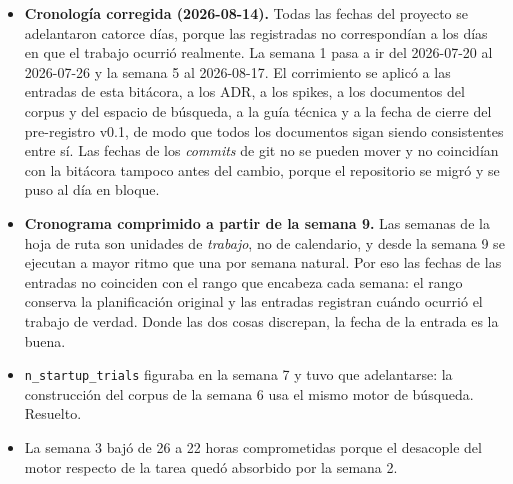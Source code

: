 \documentclass[11pt,letterpaper]{article}
\begin{document}
\begin{itemize}[leftmargin=1.4em]
  \item \textbf{Cronología corregida (2026-08-14).} Todas las fechas del proyecto se
        adelantaron catorce días, porque las registradas no correspondían a los días en
        que el trabajo ocurrió realmente. La semana 1 pasa a ir del 2026-07-20 al
        2026-07-26 y la semana 5 al 2026-08-17. El corrimiento se aplicó a las entradas de
        esta bitácora, a los ADR, a los spikes, a los documentos del corpus y del espacio
        de búsqueda, a la guía técnica y a la fecha de cierre del pre-registro v0.1, de
        modo que todos los documentos sigan siendo consistentes entre sí. Las fechas de
        los \emph{commits} de git no se pueden mover y no coincidían con la bitácora
        tampoco antes del cambio, porque el repositorio se migró y se puso al día en
        bloque.
  \item \textbf{Cronograma comprimido a partir de la semana 9.} Las semanas de la hoja
        de ruta son unidades de \emph{trabajo}, no de calendario, y desde la semana 9 se
        ejecutan a mayor ritmo que una por semana natural. Por eso las fechas de las
        entradas no coinciden con el rango que encabeza cada semana: el rango conserva la
        planificación original y las entradas registran cuándo ocurrió el trabajo de
        verdad. Donde las dos cosas discrepan, la fecha de la entrada es la buena.
  \item \texttt{n\_startup\_trials} figuraba en la semana 7 y tuvo que adelantarse: la
        construcción del corpus de la semana 6 usa el mismo motor de búsqueda. Resuelto.
  \item La semana 3 bajó de 26 a 22 horas comprometidas porque el desacople del motor
        respecto de la tarea quedó absorbido por la semana 2.
\end{itemize}
\end{document}
